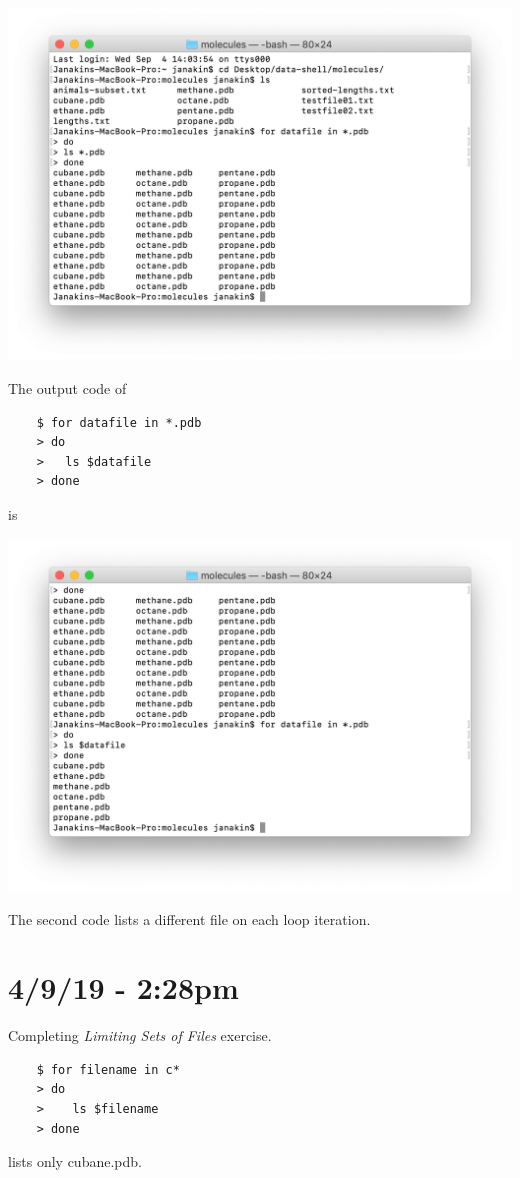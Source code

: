 \documentclass{article}
\begin{document}
\includegraphics[width=\textwidth]{fign.png}

The output code of \begin{verbatim}
    $ for datafile in *.pdb
    > do
    >	ls $datafile
    > done
\end{verbatim} is

\includegraphics[width=\textwidth]{figo.png}

The second code lists a different file on each loop iteration.

\section*{4/9/19 - 2:28pm}

Completing \textit{Limiting Sets of Files} exercise.

\begin{verbatim}
    $ for filename in c*
    > do
    >    ls $filename
    > done
\end{verbatim} lists only cubane.pdb.
\end{document}
